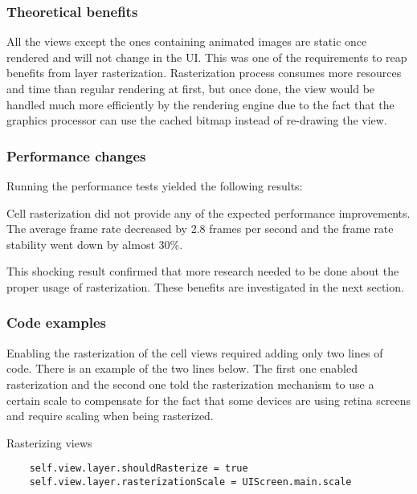 \documentclass[a4paper,12pt]{article}
\begin{document}
\subsubsection*{Theoretical benefits}
All the views except the ones containing animated images are static once rendered and will not change in the UI. This was one of the requirements to reap benefits from layer rasterization. Rasterization process consumes more resources and time than regular rendering at first, but once done, the view would be handled much more efficiently by the rendering engine due to the fact that the graphics processor can use the cached bitmap instead of re-drawing the view.\cite{MovingPixelsOntoTheScreen}

\subsubsection*{Performance changes}
Running the performance tests yielded the following results:

Cell rasterization did not provide any of the expected performance improvements. The average frame rate decreased by 2.8 frames per second and the frame rate stability went down by almost 30\%.

This shocking result confirmed that more research needed to be done about the proper usage of rasterization. These benefits are investigated in the next section.

\subsubsection*{Code examples}
Enabling the rasterization of the cell views required adding only two lines of code. There is an example of the two lines below. The first one enabled rasterization and the second one told the rasterization mechanism to use a certain scale to compensate for the fact that some devices are using retina screens and require scaling when being rasterized.
\begin{listing}[H]
  \caption{Rasterizing views}
  \begin{verbatim}
    self.view.layer.shouldRasterize = true
    self.view.layer.rasterizationScale = UIScreen.main.scale
  \end{verbatim}
\end{listing}

\end{document}

